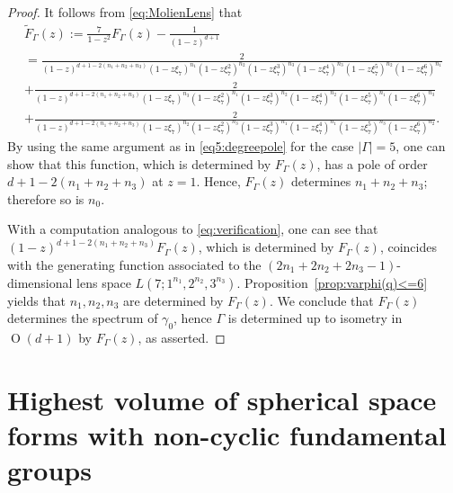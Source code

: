 \documentclass[12pt,a4paper,final]{amsart}
\theoremstyle{plain}
\theoremstyle{definition}
\theoremstyle{remark}
\numberwithin{equation}{section}
\DeclareMathOperator{\Ot}{O}
\begin{document}
\begin{proof}
It follows from \eqref{eq:MolienLens} that 
\begin{multline*}
\widetilde F_{\Gamma}(z):=
\frac{7}{1-z^2}F_{\Gamma}(z) 
-\frac{1}{(1-z)^{d+1}} 
\\
= 
 \frac{2}{(1-z)^{d+1-2(n_1+n_2+n_3)} 
	(1-z\xi_7)^{n_1}   (1-z\xi_7^2)^{n_2}
	(1-z\xi_7^3)^{n_3} (1-z\xi_7^4)^{n_3}
	(1-z\xi_7^5)^{n_2} (1-z\xi_7^6)^{n_1} }
\\
+ \frac{2}{(1-z)^{d+1-2(n_1+n_2+n_3)} 
	(1-z\xi_7)^{n_3}   (1-z\xi_7^2)^{n_1}
	(1-z\xi_7^3)^{n_2} (1-z\xi_7^4)^{n_2}
	(1-z\xi_7^5)^{n_1} (1-z\xi_7^6)^{n_3} }
\\
+ \frac{2}{(1-z)^{d+1-2(n_1+n_2+n_3)} 
	(1-z\xi_7)^{n_2}   (1-z\xi_7^2)^{n_3}
	(1-z\xi_7^3)^{n_1} (1-z\xi_7^4)^{n_1}
	(1-z\xi_7^5)^{n_3} (1-z\xi_7^6)^{n_2} }
. 
\end{multline*}
By using the same argument as in \eqref{eq5:degreepole} for the case $|\Gamma|=5$, one can show that this function, which is determined by $F_{\Gamma}(z)$, has a pole of order $d+1-2(n_1+n_2+n_3)$ at $z=1$. 
Hence, $F_{\Gamma}(z)$ determines $n_1+n_2+n_3$; therefore so is $n_0$.

With a computation analogous to \eqref{eq:verification}, one can see that  $(1-z)^{d+1-2(n_1+n_2+n_3)}F_{\Gamma}(z)$, which is determined by $F_{\Gamma}(z)$, coincides with the generating function associated to the $(2n_1+2n_2+2n_3-1)$-dimensional lens space $L(7;1^{n_1},2^{n_2},3^{n_3})$. 
Proposition~\ref{prop:varphi(q)<=6} yields that $n_1,n_2,n_3$ are determined by $F_{\Gamma}(z)$.
We conclude that $F_{\Gamma}(z)$ determines the spectrum of $\gamma_0$, hence $\Gamma$ is determined up to isometry in $\Ot(d+1)$ by $F_{\Gamma}(z)$, as asserted. 
\end{proof}






\section{Highest volume of spherical space forms with non-cyclic fundamental groups}\label{sec:errata}
\end{document}
